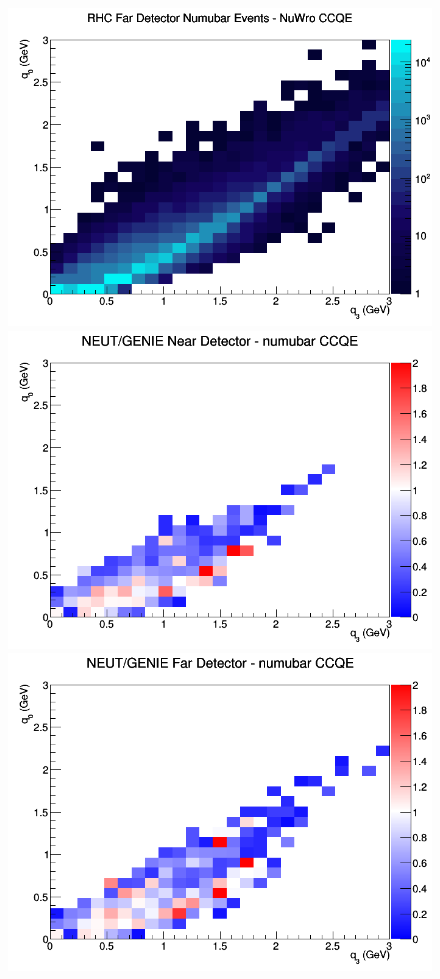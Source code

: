 \documentclass[12pt]{article}
\begin{document}
\begin{figure}[h]
\endminipage
{}
\includegraphics[width=\linewidth]{eff_q0_q3/LAr/CCQE_RHC_FD_numubar_q3_q0_NuWro.png}
\endminipage
\newline
{}
\includegraphics[width=\linewidth]{eff_q0_q3/LAr/ratios/CCQE_NEUT_GENIE_numubar_near_q3_q0.png}
\endminipage
{}
\includegraphics[width=\linewidth]{eff_q0_q3/LAr/ratios/CCQE_NEUT_GENIE_numubar_far_q3_q0.png}

\end{figure}
\end{document}
